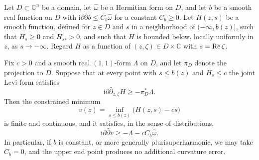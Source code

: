 \begin{lemma}\label{lem:varying-log-radius-minimum}
Let $D\subset\mathbb C^n$ be a domain, let $\widehat\omega$ be a Hermitian form on $D$, and let $b$ be a smooth real function on $D$ with $\mathrm i\partial\bar\partial b\leq C_b\widehat\omega$ for a constant $C_b\geq0$. Let $H(z,s)$ be a smooth function, defined for $z\in D$ and $s$ in a neighborhood of $(-\infty,b(z)]$, such that $H_s\geq0$ and $H_{ss}>0$, and such that $H$ is bounded below, locally uniformly in $z$, as $s\to-\infty$. Regard $H$ as a function of $(z,\zeta)\in D\times\mathbb C$ with $s=\operatorname{Re}\zeta$.

Fix $c>0$ and a smooth real $(1,1)$-form $\Lambda$ on $D$, and let $\pi_D$ denote the projection to $D$. Suppose that at every point with $s\leq b(z)$ and $H_s\leq c$ the joint Levi form satisfies
\[
 \mathrm i\partial\bar\partial_{z,\zeta}H\geq-\pi_D^*\Lambda.
\]
Then the constrained minimum
\[
 v(z)=\inf_{s\leq b(z)}\bigl(H(z,s)-cs\bigr)
\]
is finite and continuous, and it satisfies, in the sense of distributions,
\[
 \mathrm i\partial\bar\partial v\geq-\Lambda-cC_b\widehat\omega.
\]
In particular, if $b$ is constant, or more generally plurisuperharmonic, we may take $C_b=0$, and the upper end point produces no additional curvature error.
\end{lemma}
